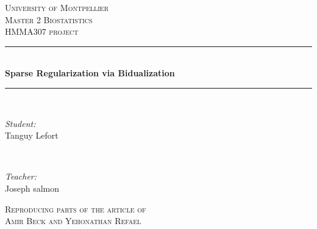 \documentclass{article}
\author{Tanguy Lefort}
\begin{document}
\begin{titlepage} 
	\newcommand{\HRule}{\rule{\linewidth}{0.5mm}}
	
	\center
	
	\textsc{\LARGE University of Montpellier}\\[1.5cm]
	
	\textsc{\Large Master 2 Biostatistics }\\[0.5cm] 
	
	\textsc{\large HMMA$307$ project}\\[0.5cm] 
    \vspace{2cm}
	\HRule\\[0.4cm]
	
	{\huge\bfseries Sparse Regularization via Bidualization}\\[0.4cm] 
	
	\HRule\\[1.5cm]
	
	\begin{minipage}{0.4\textwidth}
		\begin{flushleft}
			\large
			\textit{Student:}\\
			Tanguy Lefort
		\end{flushleft}
	\end{minipage}
	~
	\begin{minipage}{0.4\textwidth}
		\begin{flushright}
			\large
			\textit{Teacher: }\\
			Joseph salmon\\
		\end{flushright}
	\end{minipage}
	\vspace{2cm}
	\center
	\textsc{Reproducing parts of the article of\\ Amir Beck and Yehonathan Refael}
	
	\vfill %
	

\end{titlepage}
\end{document}
